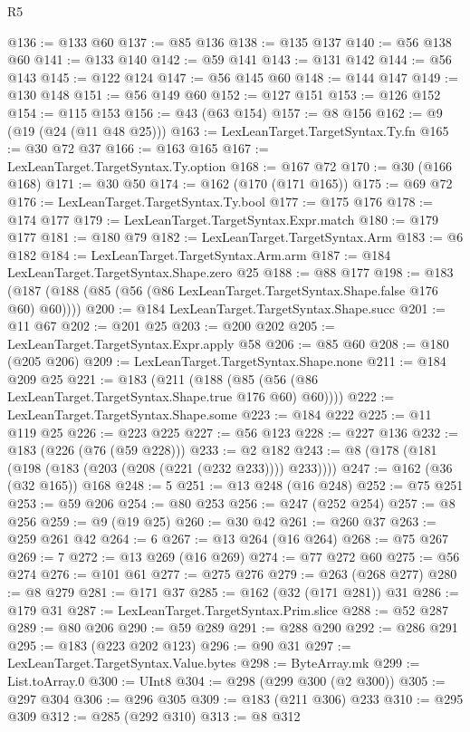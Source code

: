 \begin{lexlean}{R5}
\begin{coremodule}
@136 := @133 @60
@137 := @85 @136
@138 := @135 @137
@140 := @56 @138 @60
@141 := @133 @140
@142 := @59 @141
@143 := @131 @142
@144 := @56 @143
@145 := @122 @124
@147 := @56 @145 @60
@148 := @144 @147
@149 := @130 @148
@151 := @56 @149 @60
@152 := @127 @151
@153 := @126 @152
@154 := @115 @153
@156 := @43 (@63 @154)
@157 := @8 @156
@162 := @9 (@19 (@24 (@11 @48 @25)))
@163 := LexLeanTarget.TargetSyntax.Ty.fn
@165 := @30 @72 @37
@166 := @163 @165
@167 := LexLeanTarget.TargetSyntax.Ty.option
@168 := @167 @72
@170 := @30 (@166 @168)
@171 := @30 @50
@174 := @162 (@170 (@171 @165))
@175 := @69 @72
@176 := LexLeanTarget.TargetSyntax.Ty.bool
@177 := @175 @176
@178 := @174 @177
@179 := LexLeanTarget.TargetSyntax.Expr.match
@180 := @179 @177
@181 := @180 @79
@182 := LexLeanTarget.TargetSyntax.Arm
@183 := @6 @182
@184 := LexLeanTarget.TargetSyntax.Arm.arm
@187 := @184 LexLeanTarget.TargetSyntax.Shape.zero @25
@188 := @88 @177
@198 := @183 (@187 (@188 (@85 (@56 (@86 LexLeanTarget.TargetSyntax.Shape.false @176 @60) @60))))
@200 := @184 LexLeanTarget.TargetSyntax.Shape.succ
@201 := @11 @67
@202 := @201 @25
@203 := @200 @202
@205 := LexLeanTarget.TargetSyntax.Expr.apply @58
@206 := @85 @60
@208 := @180 (@205 @206)
@209 := LexLeanTarget.TargetSyntax.Shape.none
@211 := @184 @209 @25
@221 := @183 (@211 (@188 (@85 (@56 (@86 LexLeanTarget.TargetSyntax.Shape.true @176 @60) @60))))
@222 := LexLeanTarget.TargetSyntax.Shape.some
@223 := @184 @222
@225 := @11 @119 @25
@226 := @223 @225
@227 := @56 @123
@228 := @227 @136
@232 := @183 (@226 (@76 (@59 @228)))
@233 := @2 @182
@243 := @8 (@178 (@181 (@198 (@183 (@203 (@208 (@221 (@232 @233)))) @233))))
@247 := @162 (@36 (@32 @165)) @168
@248 := 5
@251 := @13 @248 (@16 @248)
@252 := @75 @251
@253 := @59 @206
@254 := @80 @253
@256 := @247 (@252 @254)
@257 := @8 @256
@259 := @9 (@19 @25)
@260 := @30 @42
@261 := @260 @37
@263 := @259 @261 @42
@264 := 6
@267 := @13 @264 (@16 @264)
@268 := @75 @267
@269 := 7
@272 := @13 @269 (@16 @269)
@274 := @77 @272 @60
@275 := @56 @274
@276 := @101 @61
@277 := @275 @276
@279 := @263 (@268 @277)
@280 := @8 @279
@281 := @171 @37
@285 := @162 (@32 (@171 @281)) @31
@286 := @179 @31
@287 := LexLeanTarget.TargetSyntax.Prim.slice
@288 := @52 @287
@289 := @80 @206
@290 := @59 @289
@291 := @288 @290
@292 := @286 @291
@295 := @183 (@223 @202 @123)
@296 := @90 @31
@297 := LexLeanTarget.TargetSyntax.Value.bytes
@298 := ByteArray.mk
@299 := List.toArray.{0}
@300 := UInt8
@304 := @298 (@299 @300 (@2 @300))
@305 := @297 @304
@306 := @296 @305
@309 := @183 (@211 @306) @233
@310 := @295 @309
@312 := @285 (@292 @310)
@313 := @8 @312

\end{coremodule}
\end{lexlean}
